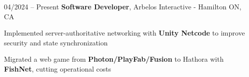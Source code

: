 \begin{twocolentry}{
    04/2024 – Present
}
\fontsize{11 pt}{11 pt}\textbf{Software Developer}, Arbelos Interactive - Hamilton ON, CA \end{twocolentry}

\vspace{0.10 cm}
\begin{onecolentry}
   \begin{highlights}
        \iftoggle{focusPythonArbelos}{
            \item Upgraded and trained several ML cloth simulation libraries using \textbf{PyTorch}, \textbf{PyTorch3D}, and \textbf{CUDA Toolkit}
            \item Developing a \textbf{TypeScript SDK} with PuerTS for dynamic runtime game scripting and content loading
        }{
            \item Developing a \textbf{TypeScript SDK} with PuerTS for dynamic runtime game scripting and content loading
            \item Upgraded and trained several ML cloth simulation libraries using \textbf{PyTorch}, \textbf{PyTorch3D}, and \textbf{CUDA Toolkit}
        }
       \item Implemented server-authoritative networking with \textbf{Unity Netcode} to improve security and state synchronization
       \item Migrated a web game from \textbf{Photon/PlayFab/Fusion} to Hathora with \textbf{FishNet}, cutting operational costs
   \end{highlights}
\end{onecolentry}
